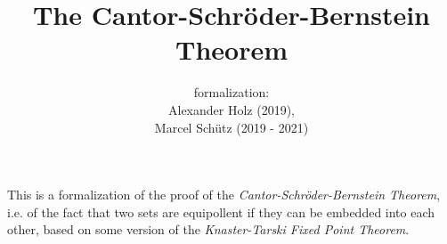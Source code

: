 \documentclass{article}
\title{The Cantor-Schröder-Bernstein Theorem}
\author{\Naproche formalization: \vspace{0.5em} \\
Alexander Holz (2019), \\
Marcel Schütz (2019 - 2021)}
\date{}
\begin{document}

  \maketitle

  This is a formalization of the proof of the \textit{Cantor-Schröder-Bernstein
  Theorem}, i.e. of the fact that two sets are equipollent if they can be
  embedded into each other, based on some version of the \textit{Knaster-Tarski
  Fixed Point Theorem}.

\end{document}
